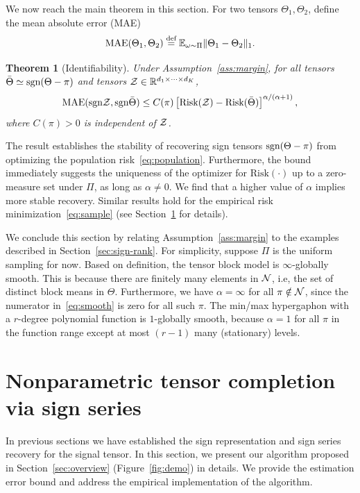 \documentclass{article}
\theoremstyle{plain}
\newtheorem{thm}{Theorem}
\theoremstyle{definition}
\def\sign{\textup{sgn}}
\begin{document}
We now reach the main theorem in this section. For two tensors $\Theta_1,\Theta_2$, define the mean absolute error (MAE)
\[
\text{MAE}(\Theta_1, \Theta_2)\stackrel{\text{def}}{=}\mathbb{E}_{\omega\sim \Pi}\lVert\Theta_1-\Theta_2\rVert_1.
\]
\begin{thm}[Identifiability]\label{thm:population}Under Assumption~\ref{ass:margin}, for all tensors $\bar \Theta \simeq \sign(\Theta-\pi)$ and tensors $\mathcal{Z}\in\mathbb{R}^{d_1\times \cdots \times d_K}$,
\[
\textup{MAE}(\sign \tZ, \sign \bar \Theta) \leq C(\pi)\left[\textup{Risk}(\tZ)-\textup{Risk}( \bar \Theta)\right]^{\alpha/(\alpha+1)},
\]
where $C(\pi)>0$ is independent of $\mathcal{Z}$. 
\end{thm}
The result establishes the stability of recovering sign tensors $\sign (\Theta-\pi)$ from optimizing the population risk~\eqref{eq:population}. Furthermore, the bound immediately suggests the uniqueness of the optimizer for $\text{Risk}(\cdot)$ up to a zero-measure set under $\Pi$, as long as $\alpha\neq 0$. We find that a higher value of $\alpha$ implies more stable recovery. Similar results hold for the empirical risk minimization~\eqref{eq:sample} (see Section~\ref{sec:estimation} for details). 

We conclude this section by relating Assumption~\ref{ass:margin} to the examples described in Section~\ref{sec:sign-rank}. For simplicity, suppose $\Pi$ is the uniform sampling for now. Based on definition, the tensor block model is $\infty$-globally smooth. This is because there are finitely many elements in $\mathcal{N}$, i.e, the set of distinct block means in $\Theta$. Furthermore, we have $\alpha= \infty$ for all $\pi \notin \mathcal{N}$, since the numerator in~\eqref{eq:smooth} is zero for all such $\pi$. The min/max hypergaphon with a $r$-degree polynomial function is $1$-globally smooth, because $\alpha=1$ for all $\pi$ in the function range except at most $(r-1)$ many (stationary) levels. 


\section{Nonparametric tensor completion via sign series}\label{sec:estimation}
In previous sections we have established the sign representation and sign series recovery for the signal tensor. In this section, we present our algorithm proposed in Section~\ref{sec:overview} (Figure~\ref{fig:demo}) in details. We provide the estimation error bound and address the empirical implementation of the algorithm. 
\end{document}

